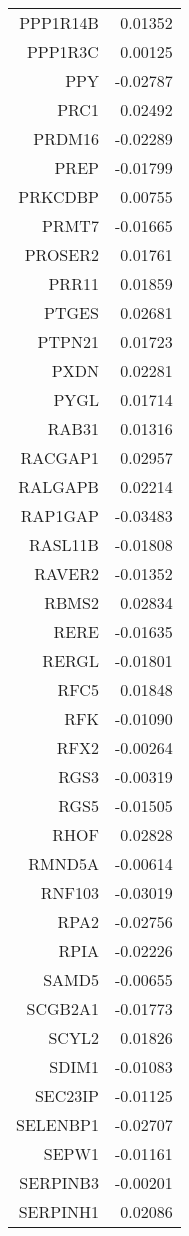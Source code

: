 \begin{longtable}{rr}
  PPP1R14B & 0.01352 \\ 
  PPP1R3C & 0.00125 \\ 
  PPY & -0.02787 \\ 
  PRC1 & 0.02492 \\ 
  PRDM16 & -0.02289 \\ 
  PREP & -0.01799 \\ 
  PRKCDBP & 0.00755 \\ 
  PRMT7 & -0.01665 \\ 
  PROSER2 & 0.01761 \\ 
  PRR11 & 0.01859 \\ 
  PTGES & 0.02681 \\ 
  PTPN21 & 0.01723 \\ 
  PXDN & 0.02281 \\ 
  PYGL & 0.01714 \\ 
  RAB31 & 0.01316 \\ 
  RACGAP1 & 0.02957 \\ 
  RALGAPB & 0.02214 \\ 
  RAP1GAP & -0.03483 \\ 
  RASL11B & -0.01808 \\ 
  RAVER2 & -0.01352 \\ 
  RBMS2 & 0.02834 \\ 
  RERE & -0.01635 \\ 
  RERGL & -0.01801 \\ 
  RFC5 & 0.01848 \\ 
  RFK & -0.01090 \\ 
  RFX2 & -0.00264 \\ 
  RGS3 & -0.00319 \\ 
  RGS5 & -0.01505 \\ 
  RHOF & 0.02828 \\ 
  RMND5A & -0.00614 \\ 
  RNF103 & -0.03019 \\ 
  RPA2 & -0.02756 \\ 
  RPIA & -0.02226 \\ 
  SAMD5 & -0.00655 \\ 
  SCGB2A1 & -0.01773 \\ 
  SCYL2 & 0.01826 \\ 
  SDIM1 & -0.01083 \\ 
  SEC23IP & -0.01125 \\ 
  SELENBP1 & -0.02707 \\ 
  SEPW1 & -0.01161 \\ 
  SERPINB3 & -0.00201 \\ 
  SERPINH1 & 0.02086 \\ 

\end{longtable}
